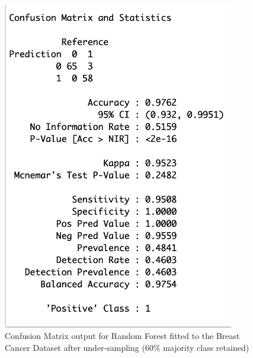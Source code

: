 \begin{figure}[!htbp]
\begin{minipage}{0.45\textwidth}
        \includegraphics[width=0.9\textwidth]{ThesisTemplate/appendix/images/Chapter5Appendix/ConfusionMatrix60/BreastCancer.png}
        \caption{Confusion Matrix output for Random Forest fitted to the Breast Cancer Dataset after under-sampling (60\% majority class retained)}
        \label{fig:my_label}
    \end{minipage}
\end{figure}

